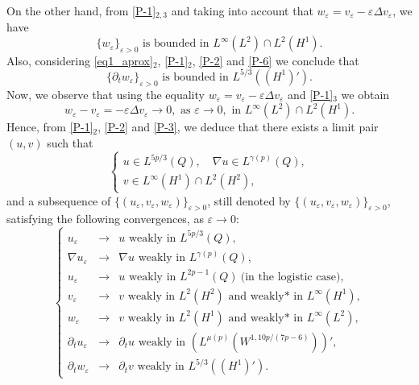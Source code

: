 \documentclass[11pt,reqno]{amsart}%
\numberwithin{equation}{section}
\begin{document}
{On the other hand, from \eqref{P-1}$_{2,3}$ and taking into account that $w_\varepsilon=v_\varepsilon-\varepsilon\Delta v_\varepsilon$, we have 
\begin{equation}\label{P-6}
\{w_\varepsilon\}_{\varepsilon>0}\mbox{ is bounded in }L^\infty(L^2)\cap L^2(H^1).
\end{equation}
Also, considering \eqref{eq1_aprox}$_2$, \eqref{P-1}$_2$, \eqref{P-2} and \eqref{P-6} we conclude that
\begin{equation}\label{P-7}
\{\partial_tw_\varepsilon\}_{\varepsilon>0}\mbox{ is bounded in }L^{5/3}((H^1)').
\end{equation}
Now, we observe that using the equality $w_\varepsilon=v_\varepsilon-\varepsilon\Delta v_\varepsilon$ and \eqref{P-1}$_3$ we obtain
\begin{equation}\label{P-8}
w_\varepsilon-v_\varepsilon=-\varepsilon\Delta v_\varepsilon\to0,\mbox{ as }\varepsilon\to0,\mbox{ in }L^\infty(L^2)\cap L^2(H^1).
\end{equation}
Hence, from \eqref{P-1}$_2$, \eqref{P-2} and \eqref{P-3}, we deduce that there exists a limit  pair $(u,v)$ such that 
$$
\left\{
\begin{array}{l}
u\in L^{5p/3}(Q),\quad  \nabla u \in L^{\gamma(p)}(Q),\\
v\in L^\infty(H^1)\cap L^2(H^2),
\end{array}
\right.
$$
and a subsequence of $\{(u_\varepsilon,v_\varepsilon,w_\varepsilon)\}_{\varepsilon>0}$, still denoted by  $\{(u_\varepsilon,v_\varepsilon,w_\varepsilon)\}_{\varepsilon>0}$, satisfying the following convergences, as $\varepsilon\to0$:
\begin{equation}\label{P-9}
\left\{
\begin{array}{rcl}
u_\varepsilon&\to&u\mbox{ weakly in }L^{5p/3}(Q),\\
\nabla u_\varepsilon&\to&\nabla u\mbox{ weakly in }L^{\gamma(p)}(Q),\\
u_\varepsilon&\to&u\mbox{ weakly in }L^{2p-1}(Q)\ \mbox{(in the logistic case),}\\
v_\varepsilon&\to&v\mbox{ weakly in }L^2(H^2)\mbox{ and weakly* in }L^\infty(H^1),\\
w_\varepsilon&\to&v\mbox{ weakly in }L^2(H^1)\mbox{ and weakly* in }L^\infty(L^2),\\
\partial_tu_\varepsilon&\to&\partial_tu\mbox{ weakly in } (L^{\mu(p)}(W^{1,10p/(7p-6)}))',\\
\partial_tw_\varepsilon&\to&\partial_tv\mbox{ weakly in }L^{5/3}((H^1)').
\end{array}

\end{equation}}
\end{document}
